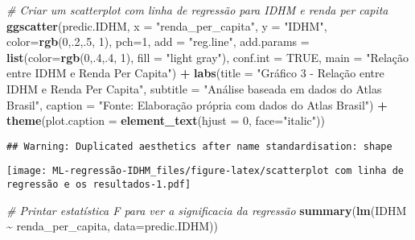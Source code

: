 \documentclass[
]{article}
\newenvironment{Shaded}{\begin{snugshade}}{\end{snugshade}}
\newcommand{\AttributeTok}[1]{\textcolor[rgb]{0.13,0.29,0.53}{#1}}
\newcommand{\CommentTok}[1]{\textcolor[rgb]{0.56,0.35,0.01}{\textit{#1}}}
\newcommand{\ConstantTok}[1]{\textcolor[rgb]{0.56,0.35,0.01}{#1}}
\newcommand{\DecValTok}[1]{\textcolor[rgb]{0.00,0.00,0.81}{#1}}
\newcommand{\FunctionTok}[1]{\textcolor[rgb]{0.13,0.29,0.53}{\textbf{#1}}}
\newcommand{\NormalTok}[1]{#1}
\newcommand{\SpecialCharTok}[1]{\textcolor[rgb]{0.81,0.36,0.00}{\textbf{#1}}}
\newcommand{\StringTok}[1]{\textcolor[rgb]{0.31,0.60,0.02}{#1}}
\begin{document}
\begin{Shaded}
\begin{Highlighting}[]
\CommentTok{\# Criar um scatterplot com linha de regressão para IDHM e renda per capita}
\FunctionTok{ggscatter}\NormalTok{(predic.IDHM, }\AttributeTok{x =} \StringTok{"renda\_per\_capita"}\NormalTok{, }\AttributeTok{y =} \StringTok{"IDHM"}\NormalTok{, }
          \AttributeTok{color=}\FunctionTok{rgb}\NormalTok{(}\DecValTok{0}\NormalTok{,.}\DecValTok{2}\NormalTok{,.}\DecValTok{5}\NormalTok{,  }\DecValTok{1}\NormalTok{), }\AttributeTok{pch=}\DecValTok{1}\NormalTok{, }\AttributeTok{add =} \StringTok{"reg.line"}\NormalTok{, }
          \AttributeTok{add.params =} \FunctionTok{list}\NormalTok{(}\AttributeTok{color=}\FunctionTok{rgb}\NormalTok{(}\DecValTok{0}\NormalTok{,.}\DecValTok{4}\NormalTok{,.}\DecValTok{4}\NormalTok{,  }\DecValTok{1}\NormalTok{), }\AttributeTok{fill =} \StringTok{"light gray"}\NormalTok{), }
          \AttributeTok{conf.int =} \ConstantTok{TRUE}\NormalTok{, }\AttributeTok{main =} \StringTok{"Relação entre IDHM e Renda Per Capita"}\NormalTok{) }\SpecialCharTok{+}
  \FunctionTok{labs}\NormalTok{(}\AttributeTok{title =} \StringTok{"Gráfico 3 {-} Relação entre IDHM e Renda Per Capita"}\NormalTok{,}
       \AttributeTok{subtitle =} \StringTok{"Análise baseada em dados do Atlas Brasil"}\NormalTok{,}
       \AttributeTok{caption =} \StringTok{"Fonte: Elaboração própria com dados do Atlas Brasil"}\NormalTok{) }\SpecialCharTok{+}
  \FunctionTok{theme}\NormalTok{(}\AttributeTok{plot.caption =} \FunctionTok{element\_text}\NormalTok{(}\AttributeTok{hjust =} \DecValTok{0}\NormalTok{, }\AttributeTok{face=}\StringTok{"italic"}\NormalTok{))}
\end{Highlighting}
\end{Shaded}

\begin{verbatim}
## Warning: Duplicated aesthetics after name standardisation: shape
\end{verbatim}

\texttt{[image: ML-regressão-IDHM\_files/figure-latex/scatterplot com linha de regressão e os resultados-1.pdf]}

\begin{Shaded}
\begin{Highlighting}[]
\CommentTok{\# Printar estatística F para ver a significacia da regressão}
\FunctionTok{summary}\NormalTok{(}\FunctionTok{lm}\NormalTok{(IDHM }\SpecialCharTok{\textasciitilde{}}\NormalTok{ renda\_per\_capita, }\AttributeTok{data=}\NormalTok{predic.IDHM))}
\end{Highlighting}
\end{Shaded}
\end{document}
